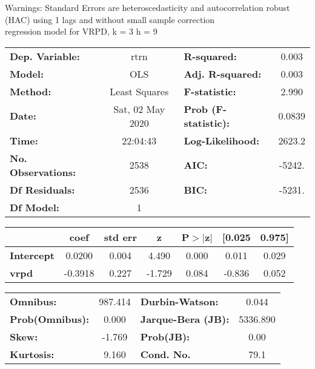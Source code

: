 Warnings: \newline
 [1] Standard Errors are heteroscedasticity and autocorrelation robust (HAC) using 1 lags and without small sample correction\\ 

regression model for VRPD, k = 3 h = 9\begin{center}
\begin{tabular}{lclc}
\toprule
\textbf{Dep. Variable:}    &       rtrn       & \textbf{  R-squared:         } &     0.003   \\
\textbf{Model:}            &       OLS        & \textbf{  Adj. R-squared:    } &     0.003   \\
\textbf{Method:}           &  Least Squares   & \textbf{  F-statistic:       } &     2.990   \\
\textbf{Date:}             & Sat, 02 May 2020 & \textbf{  Prob (F-statistic):} &   0.0839    \\
\textbf{Time:}             &     22:04:43     & \textbf{  Log-Likelihood:    } &    2623.2   \\
\textbf{No. Observations:} &        2538      & \textbf{  AIC:               } &    -5242.   \\
\textbf{Df Residuals:}     &        2536      & \textbf{  BIC:               } &    -5231.   \\
\textbf{Df Model:}         &           1      & \textbf{                     } &             \\
\bottomrule
\end{tabular}
\begin{tabular}{lcccccc}
                   & \textbf{coef} & \textbf{std err} & \textbf{z} & \textbf{P$> |$z$|$} & \textbf{[0.025} & \textbf{0.975]}  \\
\midrule
\textbf{Intercept} &       0.0200  &        0.004     &     4.490  &         0.000        &        0.011    &        0.029     \\
\textbf{vrpd}      &      -0.3918  &        0.227     &    -1.729  &         0.084        &       -0.836    &        0.052     \\
\bottomrule
\end{tabular}
\begin{tabular}{lclc}
\textbf{Omnibus:}       & 987.414 & \textbf{  Durbin-Watson:     } &    0.044  \\
\textbf{Prob(Omnibus):} &   0.000 & \textbf{  Jarque-Bera (JB):  } & 5336.890  \\
\textbf{Skew:}          &  -1.769 & \textbf{  Prob(JB):          } &     0.00  \\
\textbf{Kurtosis:}      &   9.160 & \textbf{  Cond. No.          } &     79.1  \\
\bottomrule
\end{tabular}
\end{center}

